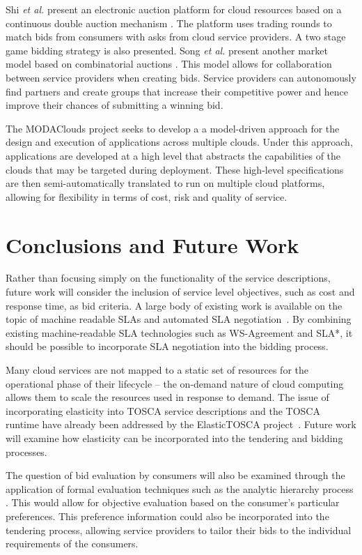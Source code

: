 \documentclass[10pt, conference, compsocconf]{IEEEtran}
\begin{document}
Shi \textit{et al.} present an electronic auction platform for cloud resources based on a continuous double auction mechanism \cite{shi2013continuous}. The platform uses trading rounds to match bids from consumers with asks from cloud service providers. A two stage game bidding strategy is also presented. Song \textit{et al.} present another market model based on combinatorial auctions \cite{song2009novel}. This model allows for collaboration between service providers when creating bids. Service providers can autonomously find partners and create groups that increase their competitive power and hence improve their chances of submitting a winning bid. 

The MODAClouds project \cite{ardagna2012modaclouds} seeks to develop a a model-driven approach for the design and execution of applications across multiple clouds. Under this approach, applications are developed at a high level that abstracts the capabilities of the clouds that may be targeted during deployment. These high-level specifications are then semi-automatically translated to run on multiple cloud platforms, allowing for flexibility in terms of cost, risk and quality of service.


\section{Conclusions and Future Work}
\label{sec:conclusion}

Rather than focusing simply on the functionality of the service descriptions, future work will consider the  inclusion of service level objectives, such as cost and response time, as bid criteria. A large body of existing work is available on the topic of machine readable SLAs and automated SLA negotiation~\cite{hasselmeyer2007, wieder2011service}. By combining existing machine-readable SLA technologies such as WS-Agreement and SLA*, it should be possible to incorporate SLA negotiation into the bidding process.

Many cloud services are not mapped to a static set of resources for the operational phase of their lifecycle -- the on-demand nature of cloud computing allows them to scale the resources used in response to demand. The issue of incorporating elasticity into TOSCA service descriptions and the TOSCA runtime have already been addressed by the ElasticTOSCA project~\cite{han2013elastic}. Future work will examine how elasticity can be incorporated into the tendering and bidding processes.

The question of bid evaluation by consumers will also be examined through the application of formal evaluation techniques such as the analytic hierarchy process \cite{saaty1988analytic}. This would allow for objective evaluation based on the consumer's particular preferences. This preference information could also be incorporated into the tendering process, allowing service providers to tailor their bids to the individual requirements of the consumers.
\end{document}
